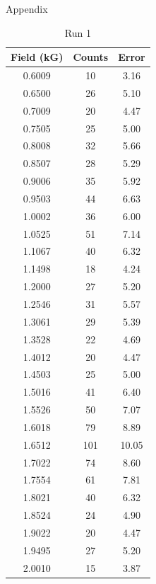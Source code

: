 \newpage \LARGE{Appendix}\\
\begin{table}[h!]
\caption{Run 1}
\begin{tabular}{|c|c|c|} \hline
Field	(kG)&	Counts	&	Error	\\	\hline
0.6009	&	10	&	3.16	\\	\hline
0.6500	&	26	&	5.10	\\	\hline
0.7009	&	20	&	4.47	\\	\hline
0.7505	&	25	&	5.00	\\	\hline
0.8008	&	32	&	5.66	\\	\hline
0.8507	&	28	&	5.29	\\	\hline
0.9006	&	35	&	5.92	\\	\hline
0.9503	&	44	&	6.63	\\	\hline
1.0002	&	36	&	6.00	\\	\hline
1.0525	&	51	&	7.14	\\	\hline
1.1067	&	40	&	6.32	\\	\hline
1.1498	&	18	&	4.24	\\	\hline
1.2000	&	27	&	5.20	\\	\hline
1.2546	&	31	&	5.57	\\	\hline
1.3061	&	29	&	5.39	\\	\hline
1.3528	&	22	&	4.69	\\	\hline
1.4012	&	20	&	4.47	\\	\hline
1.4503	&	25	&	5.00	\\	\hline
1.5016	&	41	&	6.40	\\	\hline
1.5526	&	50	&	7.07	\\	\hline
1.6018	&	79	&	8.89	\\	\hline
1.6512	&	101	&	10.05	\\	\hline
1.7022	&	74	&	8.60	\\	\hline
1.7554	&	61	&	7.81	\\	\hline
1.8021	&	40	&	6.32	\\	\hline
1.8524	&	24	&	4.90	\\	\hline
1.9022	&	20	&	4.47	\\	\hline
1.9495	&	27	&	5.20	\\	\hline
2.0010	&	15	&	3.87	\\	\hline
\end{tabular}
\end{table}

